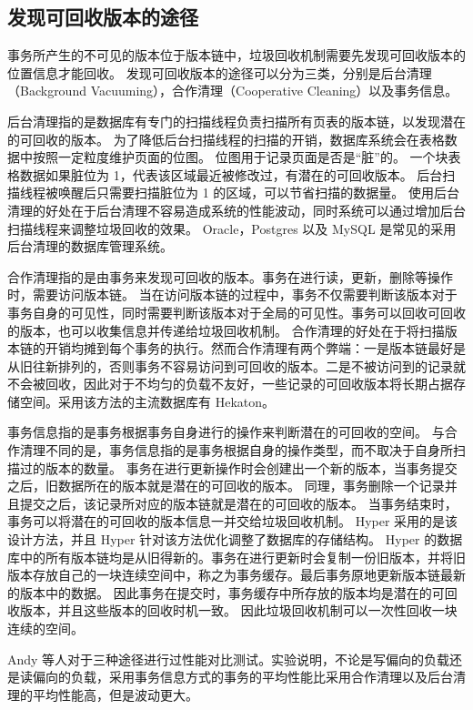 \subsection{发现可回收版本的途径}

事务所产生的不可见的版本位于版本链中，垃圾回收机制需要先发现可回收版本的位置信息才能回收。
发现可回收版本的途径可以分为三类，分别是后台清理（Background Vacuuming），合作清理（Cooperative Cleaning）以及事务信息。

后台清理指的是数据库有专门的扫描线程负责扫描所有页表的版本链，以发现潜在的可回收的版本。
为了降低后台扫描线程的扫描的开销，数据库系统会在表格数据中按照一定粒度维护页面的位图。
位图用于记录页面是否是“脏”的。
一个块表格数据如果脏位为 1，代表该区域最近被修改过，有潜在的可回收版本。
后台扫描线程被唤醒后只需要扫描脏位为 1 的区域，可以节省扫描的数据量。
使用后台清理的好处在于后台清理不容易造成系统的性能波动，同时系统可以通过增加后台扫描线程来调整垃圾回收的效果。
Oracle\cite{oracle}，Postgres\cite{pg} 以及 MySQL\cite{mysql} 是常见的采用后台清理的数据库管理系统。

合作清理指的是由事务来发现可回收的版本。事务在进行读，更新，删除等操作时，需要访问版本链。
当在访问版本链的过程中，事务不仅需要判断该版本对于事务自身的可见性，同时需要判断该版本对于全局的可见性。事务可以回收可回收的版本，也可以收集信息并传递给垃圾回收机制。
合作清理的好处在于将扫描版本链的开销均摊到每个事务的执行。然而合作清理有两个弊端：一是版本链最好是从旧往新排列的，否则事务不容易访问到可回收的版本。二是不被访问到的记录就不会被回收，因此对于不均匀的负载不友好，一些记录的可回收版本将长期占据存储空间。采用该方法的主流数据库有 Hekaton\cite{hekaton}。

事务信息指的是事务根据事务自身进行的操作来判断潜在的可回收的空间。
与合作清理不同的是，事务信息指的是事务根据自身的操作类型，而不取决于自身所扫描过的版本的数量。
事务在进行更新操作时会创建出一个新的版本，当事务提交之后，旧数据所在的版本就是潜在的可回收的版本。
同理，事务删除一个记录并且提交之后，该记录所对应的版本链就是潜在的可回收的版本。
当事务结束时，事务可以将潜在的可回收的版本信息一并交给垃圾回收机制。
Hyper\cite{hyper} 采用的是该设计方法，并且 Hyper 针对该方法优化调整了数据库的存储结构。
Hyper 的数据库中的所有版本链均是从旧得新的。事务在进行更新时会复制一份旧版本，并将旧版本存放自己的一块连续空间中，称之为事务缓存。最后事务原地更新版本链最新的版本中的数据。
因此事务在提交时，事务缓存中所存放的版本均是潜在的可回收版本，并且这些版本的回收时机一致。
因此垃圾回收机制可以一次性回收一块连续的空间。

Andy 等人对于三种途径进行过性能对比测试\cite{mvcc_evaluation}。实验说明，不论是写偏向的负载还是读偏向的负载，采用事务信息方式的事务的平均性能比采用合作清理以及后台清理的平均性能高，但是波动更大。


